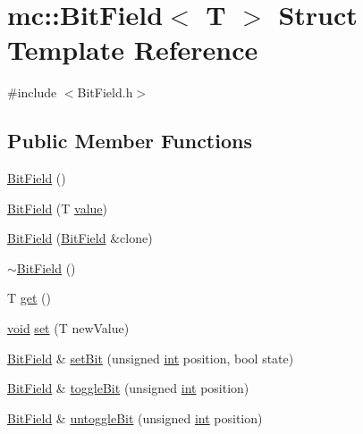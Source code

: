\hypertarget{structmc_1_1_bit_field}{}\section{mc\+:\+:Bit\+Field$<$ T $>$ Struct Template Reference}
\label{structmc_1_1_bit_field}


{\ttfamily \#include $<$Bit\+Field.\+h$>$}

\subsection*{Public Member Functions}
\begin{DoxyCompactItemize}
\item 
\hyperlink{structmc_1_1_bit_field_a7b4b827b8d03ce159039515f181e7897}{Bit\+Field} ()
\item 
\hyperlink{structmc_1_1_bit_field_a02999c42a220b488e77e390e10ba1804}{Bit\+Field} (T \hyperlink{_s_d_l__opengl__glext_8h_a8ad81492d410ff2ac11f754f4042150f}{value})
\item 
\hyperlink{structmc_1_1_bit_field_a47e7d0ee9dcf58724327d8746e0cfa99}{Bit\+Field} (\hyperlink{structmc_1_1_bit_field}{Bit\+Field} \&clone)
\item 
\hyperlink{structmc_1_1_bit_field_a839d6de6ad86a47af3e6a06a5cb96fc7}{$\sim$\+Bit\+Field} ()
\item 
T \hyperlink{structmc_1_1_bit_field_aaac2bdffaa2cf5fcdaa93d783e53c174}{get} ()
\item 
\hyperlink{_s_d_l__opengles2__gl2ext_8h_ae5d8fa23ad07c48bb609509eae494c95}{void} \hyperlink{structmc_1_1_bit_field_a8be3506d419dd9e5d7bae405ede836c3}{set} (T new\+Value)
\item 
\hyperlink{structmc_1_1_bit_field}{Bit\+Field} \& \hyperlink{structmc_1_1_bit_field_a4b93021726063ace31599f9e8a2df222}{set\+Bit} (unsigned \hyperlink{_s_d_l__thread_8h_a6a64f9be4433e4de6e2f2f548cf3c08e}{int} position, bool state)
\item 
\hyperlink{structmc_1_1_bit_field}{Bit\+Field} \& \hyperlink{structmc_1_1_bit_field_a715d75dd973a6fec9ed016b8a8d888db}{toggle\+Bit} (unsigned \hyperlink{_s_d_l__thread_8h_a6a64f9be4433e4de6e2f2f548cf3c08e}{int} position)
\item 
\hyperlink{structmc_1_1_bit_field}{Bit\+Field} \& \hyperlink{structmc_1_1_bit_field_a795cb413594e5d6e0210e4017a9242d5}{untoggle\+Bit} (unsigned \hyperlink{_s_d_l__thread_8h_a6a64f9be4433e4de6e2f2f548cf3c08e}{int} position)
\item 

\end{DoxyCompactItemize}
